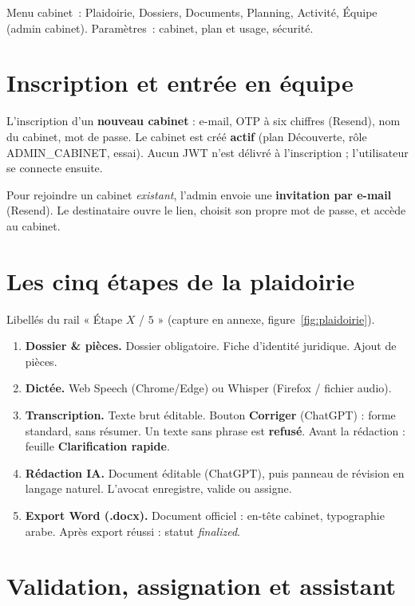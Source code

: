 \noindent Menu cabinet~: Plaidoirie, Dossiers, Documents, Planning, Activité, Équipe (admin cabinet). Paramètres~: cabinet, plan et usage, sécurité.

\section{Inscription et entrée en équipe}

L'inscription d'un \textbf{nouveau cabinet} : e-mail, OTP à six chiffres (Resend), nom du cabinet, mot de passe. Le cabinet est créé \textbf{actif} (plan Découverte, rôle ADMIN\_CABINET, essai). Aucun JWT n'est délivré à l'inscription ; l'utilisateur se connecte ensuite.

Pour rejoindre un cabinet \emph{existant}, l'admin envoie une \textbf{invitation par e-mail} (Resend). Le destinataire ouvre le lien, choisit son propre mot de passe, et accède au cabinet.

\section{Les cinq étapes de la plaidoirie}
\label{sec:guide}

Libellés du rail « Étape $X$ / $5$ » (capture en annexe, figure~\ref{fig:plaidoirie}).

\begin{enumerate}[leftmargin=1.4em]
  \item \textbf{Dossier \& pièces.} Dossier obligatoire. Fiche d'identité juridique. Ajout de pièces.
  \item \textbf{Dictée.} Web Speech (Chrome/Edge) ou Whisper (Firefox / fichier audio).
  \item \textbf{Transcription.} Texte brut éditable. Bouton \textbf{Corriger} (ChatGPT) : forme standard, sans résumer. Un texte sans phrase est \textbf{refusé}. Avant la rédaction : feuille \textbf{Clarification rapide}.
  \item \textbf{Rédaction IA.} Document éditable (ChatGPT), puis panneau de révision en langage naturel. L'avocat enregistre, valide ou assigne.
  \item \textbf{Export Word (.docx).} Document officiel : en-tête cabinet, typographie arabe. Après export réussi : statut \textit{finalized}.
\end{enumerate}

\section{Validation, assignation et assistant}

